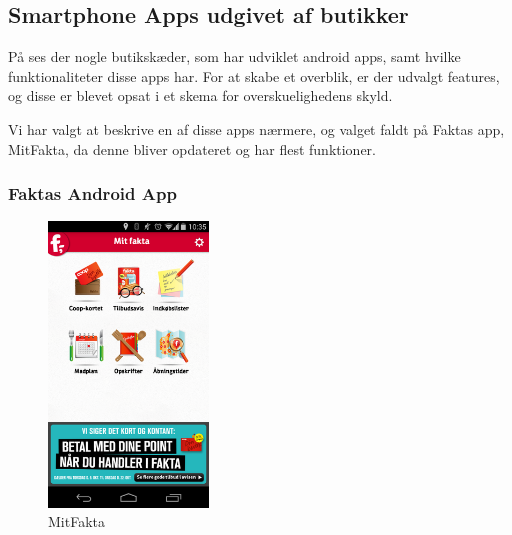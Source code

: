 \subsection{Smartphone Apps udgivet af butikker}
På  ses der nogle butikskæder, som har udviklet android apps, samt hvilke funktionaliteter disse apps har.
For at skabe et overblik, er der udvalgt features, og disse er blevet opsat i et skema for overskuelighedens skyld.

Vi har valgt at beskrive en af disse apps nærmere, og valget faldt på Faktas app, MitFakta, da denne bliver opdateret og har flest funktioner.
\subsubsection{Faktas Android App}

\begin{figure}
\vspace{-20pt}
	\begin{center}
		\includegraphics[width=0.38\textwidth]{images/Images/MitFakta.png}
	\end{center}
	\vspace{-20pt}
	\caption{MitFakta}
	\vspace{-20pt}
	\label{ss:MitFakta}
\end{figure}

